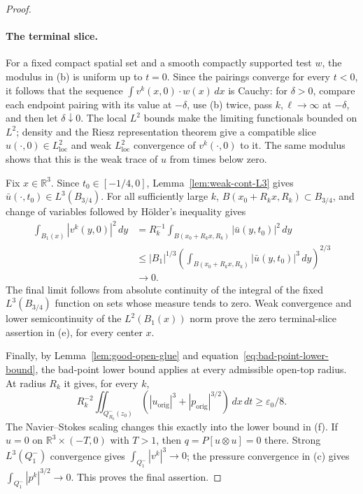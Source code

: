 \documentclass[11pt,letterpaper]{article}
\numberwithin{equation}{section}
\theoremstyle{plain}
\theoremstyle{definition}
\theoremstyle{remark}
\begin{document}
\begin{proof}
\paragraph{The terminal slice.}
For a fixed compact spatial set and a smooth compactly supported test \(w\), the modulus in (b) is uniform up to \(t=0\). Since the pairings converge for every \(t<0\), it follows that the sequence \(\int v^k(x,0)\cdot w(x)\,dx\) is Cauchy: for \(\delta>0\), compare each endpoint pairing with its value at \(-\delta\), use (b) twice, pass \(k,\ell\to\infty\) at \(-\delta\), and then let \(\delta\downarrow0\). The local \(L^2\) bounds make the limiting functionals bounded on \(L^2\); density and the Riesz representation theorem give a compatible slice \(u(\cdot,0)\in L^2_{\mathrm{loc}}\) and weak \(L^2_{\mathrm{loc}}\) convergence of \(v^k(\cdot,0)\) to it. The same modulus shows that this is the weak trace of \(u\) from times below zero.

Fix \(x\in\mathbb R^3\). Since \(t_0\in[-1/4,0]\), Lemma~\ref{lem:weak-cont-L3} gives \(\bar u(\cdot,t_0)\in L^3(B_{3/4})\). For all sufficiently large \(k\), \(B(x_0+R_kx,R_k)\subset B_{3/4}\), and change of variables followed by Hölder's inequality gives
\begin{align*}
 \int_{B_1(x)}|v^k(y,0)|^2\,dy
 &=R_k^{-1}\int_{B(x_0+R_kx,R_k)}|\bar u(y,t_0)|^2\,dy\\
 &\le |B_1|^{1/3}
       \left(\int_{B(x_0+R_kx,R_k)}|\bar u(y,t_0)|^3\,dy\right)^{2/3}\\
 &\longrightarrow0.
\end{align*}
The final limit follows from absolute continuity of the integral of the fixed \(L^3(B_{3/4})\) function on sets whose measure tends to zero. Weak convergence and lower semicontinuity of the \(L^2(B_1(x))\) norm prove the zero terminal-slice assertion in (e), for every center \(x\).

Finally, by Lemma~\ref{lem:good-open-glue} and equation~\eqref{eq:bad-point-lower-bound}, the bad-point lower bound applies at every admissible open-top radius. At radius \(R_k\) it gives, for every \(k\),
\begin{equation*}
 R_k^{-2}\iint_{Q_{R_k}^-(z_0)}
       (|u_{\mathrm{orig}}|^3+|p_{\mathrm{orig}}|^{3/2})\,dx\,dt\ge\varepsilon_0/8.
\end{equation*}
The Navier--Stokes scaling changes this exactly into the lower bound in (f). If \(u=0\) on \(\mathbb R^3\times(-T,0)\) with \(T>1\), then \(q=P[u\otimes u]=0\) there. Strong \(L^3(Q_1^-)\) convergence gives \(\int_{Q_1^-}|v^k|^3\to0\); the pressure convergence in (c) gives \(\int_{Q_1^-}|p^k|^{3/2}\to0\). This proves the final assertion.

\end{proof}
\end{document}
